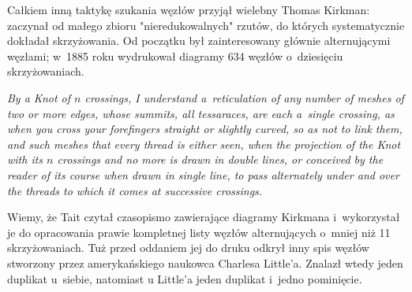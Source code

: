 Całkiem inną taktykę szukania węzłów przyjął wielebny Thomas Kirkman: zaczynał od małego zbioru "nieredukowalnych" rzutów, do których systematycznie dokładał skrzyżowania.
%
Od początku był zainteresowany głównie alternującymi węzłami; w~1885 roku wydrukował diagramy 634 węzłów o~dziesięciu skrzyżowaniach.

\begin{definition}
    \emph{By a Knot of $n$ crossings, I understand a~reticulation of any number of meshes of two or more edges, whose summits, all tessaraces, are each a~single crossing, as when you cross your forefingers straight or slightly curved, so as not to link them, and such meshes that every thread is either seen, when the projection of the Knot with its $n$ crossings and no more is drawn in double lines, or conceived by the reader of its course when drawn in single line, to pass alternately under and over the threads to which it comes at successive crossings.}
\end{definition}

Wiemy, że Tait czytał czasopismo zawierające diagramy Kirkmana i~wykorzystał je do opracowania prawie kompletnej listy węzłów alternujących o~mniej niż 11 skrzyżowaniach.
Tuż przed oddaniem jej do druku odkrył inny spis węzłów stworzony przez amerykańskiego naukowca Charlesa Little'a.
%
Znalazł wtedy jeden duplikat u~siebie, natomiast u Little'a jeden duplikat i~jedno pominięcie.

